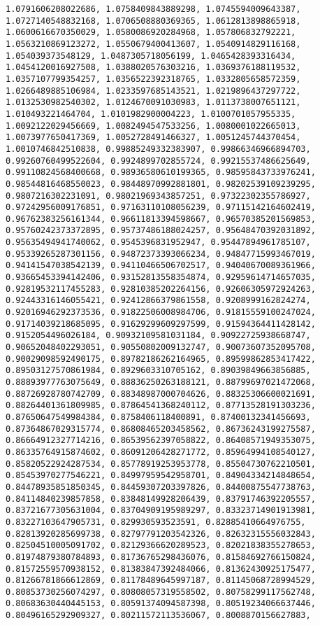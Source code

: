 \documentclass[11pt]{article}
\begin{document}
\begin{Verbatim}[commandchars=\\\{\}]
1.0791606208022686, 1.0758409843889298, 1.0745594009643387, 1.0727140548832168, 1.0706508880369365, 1.0612813898865918, 1.0600616670350029, 1.0580086920284968, 1.057806832792221, 1.0563210869123272, 1.0550679400413607, 1.0540914829116168, 1.054039373548129, 1.0487305718056199, 1.0465428393316434, 1.0454120016927508, 1.0388020576303216, 1.0369376188119532, 1.0357107799354257, 1.0356522392318765, 1.0332805658572359, 1.0266489885106984, 1.0233597685143521, 1.0219896437297722, 1.0132530982540302, 1.0124670091030983, 1.0113738007651121, 1.010493221464704, 1.0101982900004223, 1.0100701057955335, 1.0092122029456669, 1.0082494547533256, 1.0080001022665013, 1.0073977650417369, 1.0052728491466327, 1.0051245744370454, 1.0010746842510838, 0.99885249332383907, 0.99866346966894703, 0.99260760499522604, 0.9924899702855724, 0.99215537486625649, 0.99110824568400668, 0.98936580610199365, 0.98595843733976241, 0.98544816468550023, 0.98448970992881801, 0.98202539109239295, 0.9807216302231091, 0.98021969343857251, 0.97322302355786927, 0.97242956009176851, 0.97163110108056239, 0.97115142164602419, 0.96762383256161344, 0.96611813394598667, 0.96570385201569853, 0.95760242373372895, 0.95737486188024257, 0.95648470392031892, 0.95635494941740062, 0.9545396831952947, 0.95447894961785107, 0.95339265287301156, 0.94872373393066234, 0.94847715993467019, 0.94141547038542139, 0.94110466506702517, 0.94040670089361966, 0.93665453394142406, 0.93152813558354874, 0.92959614714657035, 0.92819532117455283, 0.92810385202264156, 0.92606305972924263, 0.92443316146055421, 0.92412866379861558, 0.9208999162824274, 0.92016946292373536, 0.91822506008984706, 0.91815559100247024, 0.91714039218685095, 0.91629299609297599, 0.91594364411428142, 0.9152054496026184, 0.90932109581031184, 0.90922725938668747, 0.90652048402293051, 0.90550802009132747, 0.90073607352095708, 0.90029098592490175, 0.89782186262164965, 0.89599862853417422, 0.89503127570861984, 0.8929603310705162, 0.89039849663856885, 0.88893977763075649, 0.88836250263188121, 0.88799697021472068, 0.88726928780742709, 0.88348987000704626, 0.88325306600021691, 0.88264401361809985, 0.87864541368240112, 0.87713528191303236, 0.87650647549984384, 0.8758406118400891, 0.87400132341456693, 0.87364867029315774, 0.86808465203458562, 0.86736243199275587, 0.86664912327714216, 0.86539562397058822, 0.86408571949353075, 0.86335764915874602, 0.86091206428271772, 0.85964994108540127, 0.85820522924287534, 0.85778919253953778, 0.85504730762210501, 0.85453970277546221, 0.84997959542958701, 0.84904334214848654, 0.84478935851850345, 0.84459307203397826, 0.84400875547738763, 0.84114840239857858, 0.83848149928206439, 0.83791746392205557, 0.83721677305631004, 0.83704909195989297, 0.83323714901913981, 0.83227103647905731, 0.829930593523591, 0.82885410664976755, 0.82813920285699738, 0.82797791203542326, 0.82632315556032843, 0.82504510005091702, 0.82129366620289523, 0.82021838355278653, 0.81974879380784893, 0.81736765298436076, 0.81584692766150824, 0.81572559570938152, 0.81383847392484066, 0.81362430925175477, 0.81266781866612869, 0.81178489645997187, 0.81145068728994529, 0.80853730256074297, 0.80808057319558502, 0.80758299117562748, 0.80683630440445153, 0.80591374094587398, 0.80519234066637446, 0.80496165292909327, 0.80211572113536067, 0.8008870156627883, 
\end{Verbatim}
\end{document}
